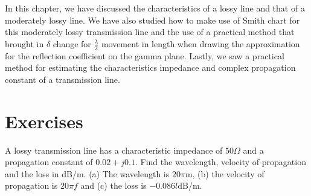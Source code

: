 In this chapter, we have discussed the characteristics of a lossy line and that of a moderately lossy line. We have also studied how to make use of Smith chart for this moderately lossy transmission line and the use of a practical method that brought in $\delta$ change for $\frac{\lambda}{2}$ movement in length when drawing the approximation for the reflection coefficient on the gamma plane. Lastly, we saw a practical method for estimating the characteristics impedance and complex propagation constant of a transmission line.

\section*{Exercises}
\begin{ExerciseList}
\Exercise[label={ex131}]
A lossy transmission line has a characteristic impedance of $50\varOmega$ and a propagation constant of $0.02 + j0.1$. Find the wavelength, velocity of propagation and the loss in dB/m.
\Answer[ref={ex131}]
(a) The wavelength is $20\pi$m, (b) the velocity of propagation is $20\pi f$ and (c) the loss is $-0.086l$dB/m.
\end{ExerciseList}